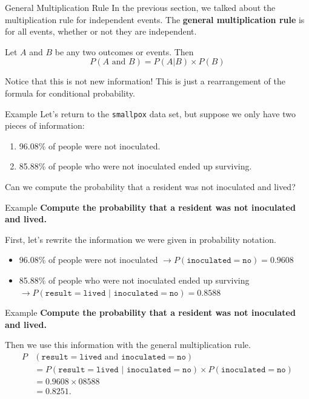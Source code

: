 \begin{frame}{General Multiplication Rule}
    In the previous section, we talked about the multiplication rule for independent events. The \textbf{general multiplication rule} is for all events, whether or not they are independent.
    
    \vspace{12pt}Let $A$ and $B$ be any two outcomes or events. Then
    \[
    P(A \text{ and } B) = P(A|B)\times P(B)
    \]
    
    \vspace{12pt}Notice that this is not new information! This is just a rearrangement of the formula for conditional probability. 
\end{frame}

\begin{frame}{Example}
    Let's return to the \texttt{smallpox} data set, but suppose we only have two pieces of information:
    \begin{enumerate}
        \item 96.08\% of people were not inoculated.
        \item 85.88\% of people who were not inoculated ended up surviving.
    \end{enumerate}
    
    \vspace{12pt}Can we compute the probability that a resident was not inoculated and lived?
\end{frame}

\begin{frame}{Example}
    \textbf{Compute the probability that a resident was not inoculated and lived.}
    
    \vspace{12pt}First, let's rewrite the information we were given in probability notation.
    \begin{itemize}
        \item 96.08\% of people were not inoculated $\rightarrow P(\texttt{inoculated}=\texttt{no})=0.9608$
        \item 85.88\% of people who were not inoculated ended up surviving $\rightarrow P(\texttt{result}=\texttt{lived }|\texttt{ inoculated}=\texttt{no})=0.8588$
    \end{itemize}
\end{frame}

\begin{frame}{Example}
    \textbf{Compute the probability that a resident was not inoculated and lived.}
    
    \vspace{12pt}Then we use this information with the general multiplication rule.
    \begin{align*}
        P&(\texttt{result}=\texttt{lived} \text{ and } \texttt{inoculated}=\texttt{no}) \\
        &=P(\texttt{result}=\texttt{lived } | \texttt{ inoculated}=\texttt{no})\times P(\texttt{inoculated}=\texttt{no}) \\
        &= 0.9608\times08588 \\
        &= 0.8251.
    \end{align*}
\end{frame}

